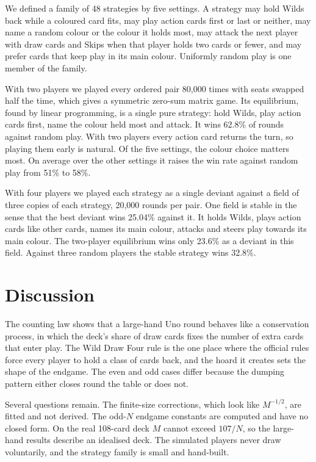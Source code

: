\documentclass[11pt]{amsart}
\theoremstyle{remark}
\begin{document}
We defined a family of 48 strategies by five settings. A strategy may hold Wilds back while a coloured card fits, may play action cards first or last or neither, may name a random colour or the colour it holds most, may attack the next player with draw cards and Skips when that player holds two cards or fewer, and may prefer cards that keep play in its main colour. Uniformly random play is one member of the family.

With two players we played every ordered pair 80{,}000 times with seats swapped half the time, which gives a symmetric zero-sum matrix game. Its equilibrium, found by linear programming, is a single pure strategy: hold Wilds, play action cards first, name the colour held most and attack. It wins 62.8\% of rounds against random play. With two players every action card returns the turn, so playing them early is natural. Of the five settings, the colour choice matters most. On average over the other settings it raises the win rate against random play from 51\% to 58\%.

With four players we played each strategy as a single deviant against a field of three copies of each strategy, 20{,}000 rounds per pair. One field is stable in the sense that the best deviant wins 25.04\% against it. It holds Wilds, plays action cards like other cards, names its main colour, attacks and steers play towards its main colour. The two-player equilibrium wins only 23.6\% as a deviant in this field. Against three random players the stable strategy wins 32.8\%.

\section{Discussion}

The counting law shows that a large-hand Uno round behaves like a conservation process, in which the deck's share of draw cards fixes the number of extra cards that enter play. The Wild Draw Four rule is the one place where the official rules force every player to hold a class of cards back, and the hoard it creates sets the shape of the endgame. The even and odd cases differ because the dumping pattern either closes round the table or does not.

Several questions remain. The finite-size corrections, which look like $M^{-1/2}$, are fitted and not derived. The odd-$N$ endgame constants are computed and have no closed form. On the real 108-card deck $M$ cannot exceed $107/N$, so the large-hand results describe an idealised deck. The simulated players never draw voluntarily, and the strategy family is small and hand-built.
\end{document}
